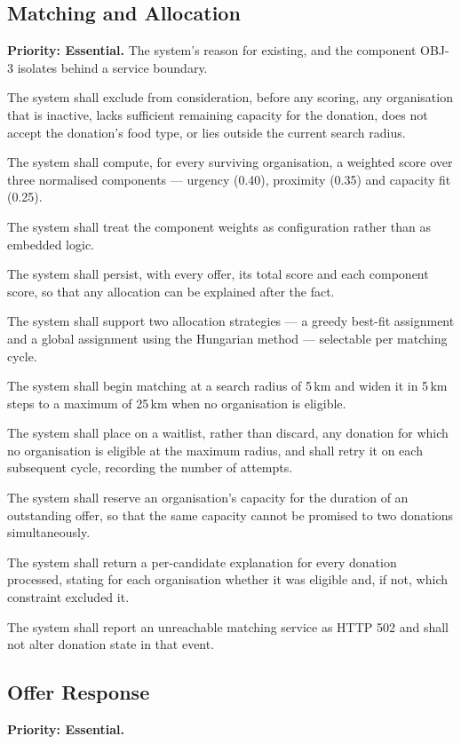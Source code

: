 \documentclass[11pt,a4paper]{article}
\newcommand{\req}[2]{\item[\textbf{#1}] #2}
\begin{document}
\subsection{Matching and Allocation}
\textbf{Priority: Essential.} The system's reason for existing, and the
component OBJ-3 isolates behind a service boundary.

\begin{description}[leftmargin=1.6cm,style=nextline,font=\normalfont\bfseries]
  \req{FR-22}{The system shall exclude from consideration, before any scoring,
    any organisation that is inactive, lacks sufficient remaining capacity for
    the donation, does not accept the donation's food type, or lies outside the
    current search radius.}
  \req{FR-23}{The system shall compute, for every surviving organisation, a
    weighted score over three normalised components --- urgency (0.40),
    proximity (0.35) and capacity fit (0.25).}
  \req{FR-24}{The system shall treat the component weights as configuration
    rather than as embedded logic.}
  \req{FR-25}{The system shall persist, with every offer, its total score and
    each component score, so that any allocation can be explained after the
    fact.}
  \req{FR-26}{The system shall support two allocation strategies --- a greedy
    best-fit assignment and a global assignment using the Hungarian method ---
    selectable per matching cycle.}
  \req{FR-27}{The system shall begin matching at a search radius of 5\,km and
    widen it in 5\,km steps to a maximum of 25\,km when no organisation is
    eligible.}
  \req{FR-28}{The system shall place on a waitlist, rather than discard, any
    donation for which no organisation is eligible at the maximum radius, and
    shall retry it on each subsequent cycle, recording the number of attempts.}
  \req{FR-29}{The system shall reserve an organisation's capacity for the
    duration of an outstanding offer, so that the same capacity cannot be
    promised to two donations simultaneously.}
  \req{FR-30}{The system shall return a per-candidate explanation for every
    donation processed, stating for each organisation whether it was eligible
    and, if not, which constraint excluded it.}
  \req{FR-31}{The system shall report an unreachable matching service as
    HTTP 502 and shall not alter donation state in that event.}
\end{description}

\subsection{Offer Response}
\textbf{Priority: Essential.}
\end{document}
